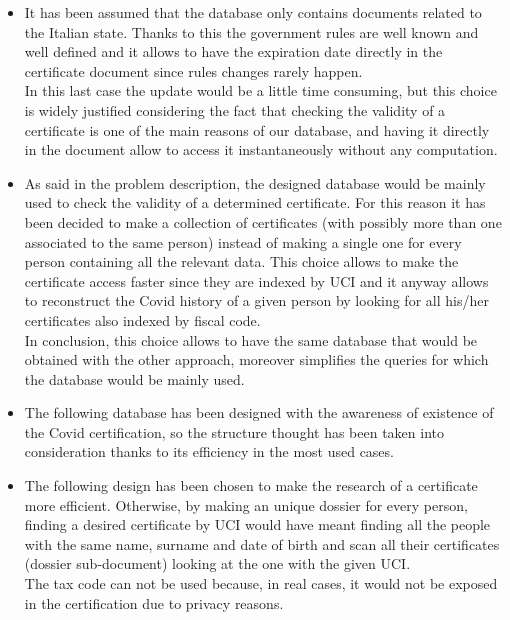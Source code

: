 \documentclass{article}
\begin{document}
\begin{itemize}


\item It has been assumed that the database only contains documents related to the Italian state. Thanks to this the government rules are well known and well defined and it allows to have the expiration date directly in the certificate document since rules changes rarely happen.
\\In this last case the update would be a little time consuming, but this choice is widely justified considering the fact that checking the validity of a certificate is one of the main reasons of our database, and having it directly in the document allow to access it instantaneously without any computation.
\item As said in the problem description, the designed database would be mainly used to check the validity of a determined certificate. For this reason it has been decided to make a collection of certificates (with possibly more than one associated to the same person) instead of making a single one for every person containing all the relevant data. This choice allows to make the certificate access faster since they are indexed by UCI and it anyway allows to reconstruct the Covid history of a given person by looking for all his/her certificates also indexed by fiscal code.
\\In conclusion, this choice allows to have the same database that would be obtained with the other approach, moreover simplifies the queries for which the database would be mainly used.
\item The following database has been designed with the awareness of existence of the Covid certification, so the structure thought has been taken into consideration thanks to its efficiency in the most used cases.
\item The following design has been chosen to make the research of a certificate more efficient. Otherwise, by making an unique dossier for every person, finding a desired certificate by UCI would have meant finding all the people with the same name, surname and date of birth and scan all their certificates (dossier sub-document) looking at the one with the given UCI. \\The tax code can not be used because, in real cases, it would not be exposed in the certification due to privacy reasons.

\end{itemize}
\end{document}
